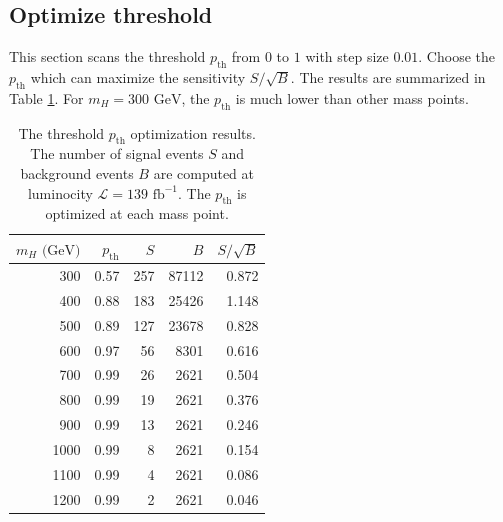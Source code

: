 \documentclass[12pt]{article}
\begin{document}
	\subsection{Optimize threshold}%
	\label{sub:optimize_threshold}
		This section scans the threshold $p_{\text{th}}$ from $0$ to $1$ with step size $0.01$.	Choose the $p_{\text{th}}$ which can maximize the sensitivity $S / \sqrt{B}$. The results are summarized in Table \ref{tab:SPANet_mix_resonant_threshold_scan}. For $m_H = \text{300 GeV}$, the $p_{\text{th}}$ is much lower than other mass points.
		\begin{table}[htpb]
			\centering
			\caption{The threshold $p_{\text{th}}$ optimization results. The number of signal events $S$ and background events $B$ are computed at luminocity $\mathcal{L} = 139 \text{ fb}^{-1}$. The $p_{\text{th}}$ is optimized at each mass point.}
			\label{tab:SPANet_mix_resonant_threshold_scan}
			\begin{tabular}{r|r|rr|r}
				$m_H \text{ (GeV)}$ & $p_{\text{th}}$ & $S$ & $B$   & $S / \sqrt{B}$ \\ \hline
				300   & 0.57            & 257 & 87112 & 0.872          \\
				400   & 0.88            & 183 & 25426 & 1.148          \\
				500   & 0.89            & 127 & 23678 & 0.828          \\
				600   & 0.97            & 56  & 8301  & 0.616          \\
				700   & 0.99            & 26  & 2621  & 0.504          \\
				800   & 0.99            & 19  & 2621  & 0.376          \\
				900   & 0.99            & 13  & 2621  & 0.246          \\
				1000  & 0.99            & 8   & 2621  & 0.154          \\
				1100  & 0.99            & 4   & 2621  & 0.086          \\
				1200  & 0.99            & 2   & 2621  & 0.046         
			\end{tabular}
		\end{table}
\end{document}
